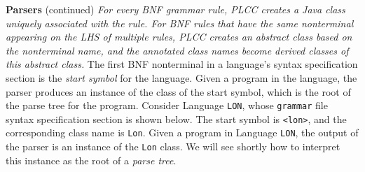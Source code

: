 \begin{minipage}[t]{\sw}
\slidenumber
\LARGE
{\bf Parsers} (continued)\exx
{\em
For every BNF grammar rule,
PLCC creates a Java class uniquely associated with the rule.
For BNF rules that have the same nonterminal appearing
on the LHS of multiple rules,
PLCC creates an abstract class based on the nonterminal name,
and the annotated class names
become derived classes of this abstract class.}\exx
The first BNF nonterminal
in a language's syntax specification section
is the {\em start symbol} for the language.
Given a program in the language,
the parser produces an instance of the class of the start symbol,
which is the root of the parse tree for the program.\exx
Consider Language \verb'LON',
whose \verb'grammar' file syntax specification section is shown below.
The start symbol is \verb'<lon>',
and the corresponding class name is \verb'Lon'.
Given a program in Language \verb'LON',
the output of the parser is an instance of the \verb'Lon' class.
We will see shortly how to interpret this instance
as the root of a {\em parse tree}.\exx
\emm\LightBox{\MYlonGrammarOnly}
\end{minipage}
\clearpage
